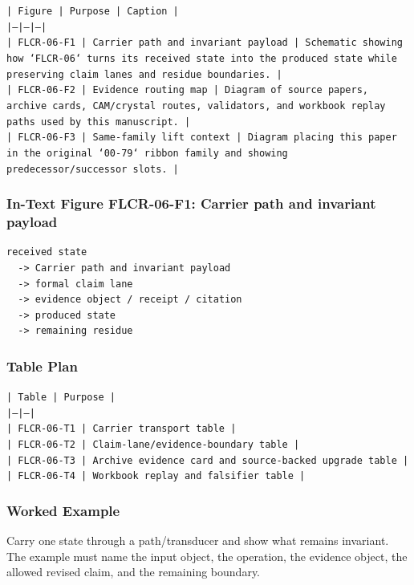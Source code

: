 \documentclass[11pt]{article}
\begin{document}
\noindent\texttt{| Figure | Purpose | Caption |}\\
\noindent\texttt{|---|---|---|}\\
\noindent\texttt{| FLCR-06-F1 | Carrier path and invariant payload | Schematic showing how `FLCR-06` turns its received state into the produced state while preserving claim lanes and residue boundaries. |}\\
\noindent\texttt{| FLCR-06-F2 | Evidence routing map | Diagram of source papers, archive cards, CAM/crystal routes, validators, and workbook replay paths used by this manuscript. |}\\
\noindent\texttt{| FLCR-06-F3 | Same-family lift context | Diagram placing this paper in the original `00-79` ribbon family and showing predecessor/successor slots. |}\\

\subsubsection*{In-Text Figure FLCR-06-F1: Carrier path and invariant payload}

\begin{verbatim}
received state
  -> Carrier path and invariant payload
  -> formal claim lane
  -> evidence object / receipt / citation
  -> produced state
  -> remaining residue
\end{verbatim}

\subsubsection*{Table Plan}

\noindent\texttt{| Table | Purpose |}\\
\noindent\texttt{|---|---|}\\
\noindent\texttt{| FLCR-06-T1 | Carrier transport table |}\\
\noindent\texttt{| FLCR-06-T2 | Claim-lane/evidence-boundary table |}\\
\noindent\texttt{| FLCR-06-T3 | Archive evidence card and source-backed upgrade table |}\\
\noindent\texttt{| FLCR-06-T4 | Workbook replay and falsifier table |}\\

\subsubsection*{Worked Example}

Carry one state through a path/transducer and show what remains invariant. The example must name the input object, the operation,
the evidence object, the allowed revised claim, and the remaining boundary.
\end{document}
